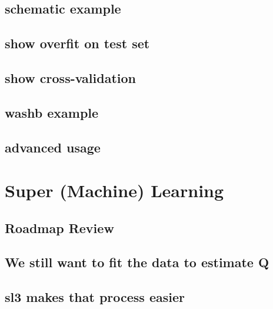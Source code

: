 \documentclass[
  12pt, krantz2,
]{krantz}
\theoremstyle{definition}
\theoremstyle{definition}
\theoremstyle{definition}
\newcommand{\1}{\mathbbm{1}}
\begin{document}
\hypertarget{schematic-example-1}{%
\section{schematic example}\label{schematic-example-1}}

\hypertarget{show-overfit-on-test-set}{%
\section{show overfit on test set}\label{show-overfit-on-test-set}}

\hypertarget{show-cross-validation}{%
\section{show cross-validation}\label{show-cross-validation}}

\hypertarget{washb-example}{%
\section{washb example}\label{washb-example}}

\hypertarget{advanced-usage}{%
\section{advanced usage}\label{advanced-usage}}

\hypertarget{sl3}{%
\chapter{Super (Machine) Learning}\label{sl3}}

\hypertarget{roadmap-review-1}{%
\section{Roadmap Review}\label{roadmap-review-1}}

\hypertarget{we-still-want-to-fit-the-data-to-estimate-q}{%
\section{We still want to fit the data to estimate Q}\label{we-still-want-to-fit-the-data-to-estimate-q}}

\hypertarget{sl3-makes-that-process-easier}{%
\section{sl3 makes that process easier}\label{sl3-makes-that-process-easier}}
\end{document}
